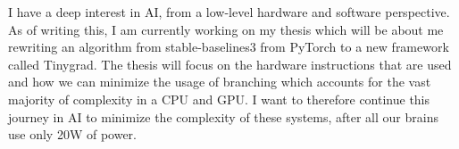 \documentclass[../../main.tex]{subfiles}
\begin{document}
I have a deep interest in AI, from a low-level hardware and software perspective. As of writing this, I am currently working on my thesis which will be about me rewriting an algorithm from stable-baselines3 from PyTorch to a new framework called Tinygrad. The thesis will focus on the hardware instructions that are used and how we can minimize the usage of branching which accounts for the vast majority of complexity in a CPU and GPU. I want to therefore continue this journey in AI to minimize the complexity of these systems, after all our brains use only 20W of power.
\\
\end{document}
